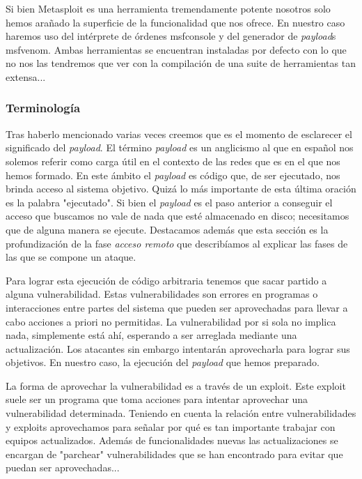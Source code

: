 \documentclass[12pt]{article}
\newcommand{\newpar} {
    \vskip 0.5cm
}
\begin{document}
                \newpar

                Si bien Metasploit es una herramienta tremendamente potente nosotros solo hemos arañado la superficie de la funcionalidad que nos ofrece. En nuestro caso haremos uso del intérprete de órdenes msfconsole y del generador de \textit{payload}s msfvenom. Ambas herramientas se encuentran instaladas por defecto con lo que no nos las tendremos que ver con la compilación de una suite de herramientas tan extensa...

            \subsubsection{Terminología}
                Tras haberlo mencionado varias veces creemos que es el momento de esclarecer el significado del \textit{payload}. El término \textit{payload} es un anglicismo al que en español nos solemos referir como carga útil en el contexto de las redes que es en el que nos hemos formado. En este ámbito el \textit{payload} es código que, de ser ejecutado, nos brinda acceso al sistema objetivo. Quizá lo más importante de esta última oración es la palabra "ejecutado". Si bien el \textit{payload} es el paso anterior a conseguir el acceso que buscamos no vale de nada que esté almacenado en disco; necesitamos que de alguna manera se ejecute. Destacamos además que esta sección es la profundización de la fase \textit{acceso remoto} que describíamos al explicar las fases de las que se compone un ataque.

                \newpar

                Para lograr esta ejecución de código arbitraria tenemos que sacar partido a alguna vulnerabilidad. Estas vulnerabilidades son errores en programas o interacciones entre partes del sistema que pueden ser aprovechadas para llevar a cabo acciones a priori no permitidas. La vulnerabilidad por si sola no implica nada, simplemente está ahí, esperando a ser arreglada mediante una actualización. Los atacantes sin embargo intentarán aprovecharla para lograr sus objetivos. En nuestro caso, la ejecución del \textit{payload} que hemos preparado.

                \newpar

                La forma de aprovechar la vulnerabilidad es a través de un exploit. Este exploit suele ser un programa que toma acciones para intentar aprovechar una vulnerabilidad determinada. Teniendo en cuenta la relación entre vulnerabilidades y exploits aprovechamos para señalar por qué es tan importante trabajar con equipos actualizados. Además de funcionalidades nuevas las actualizaciones se encargan de "parchear" vulnerabilidades que se han encontrado para evitar que puedan ser aprovechadas...
\end{document}
